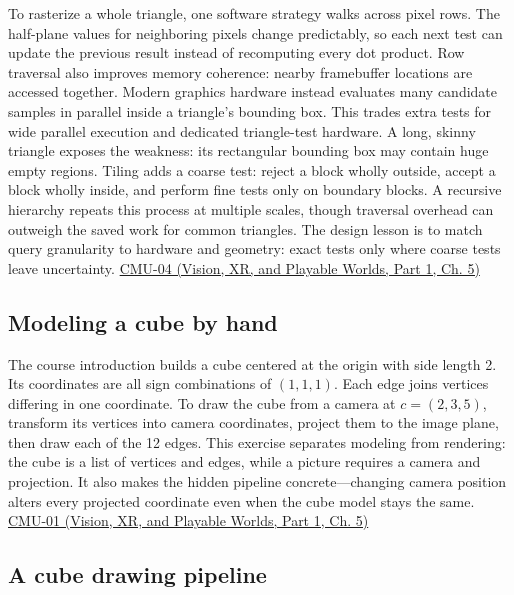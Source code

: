 To rasterize a whole triangle, one software strategy walks across pixel rows. The half-plane values for neighboring pixels change predictably, so each next test can update the previous result instead of recomputing every dot product. Row traversal also improves memory coherence: nearby framebuffer locations are accessed together. Modern graphics hardware instead evaluates many candidate samples in parallel inside a triangle's bounding box. This trades extra tests for wide parallel execution and dedicated triangle-test hardware. A long, skinny triangle exposes the weakness: its rectangular bounding box may contain huge empty regions. Tiling adds a coarse test: reject a block wholly outside, accept a block wholly inside, and perform fine tests only on boundary blocks. A recursive hierarchy repeats this process at multiple scales, though traversal overhead can outweigh the saved work for common triangles. The design lesson is to match query granularity to hardware and geometry: exact tests only where coarse tests leave uncertainty. \href{../07-Vision-XR-and-Playable-Worlds-P01/main.pdf\#nameddest=04-visual-computing-ii-ch036-cmu-04---drawing-a-triangle-and-an-intro-to-sampling}{CMU-04 (Vision, XR, and Playable Worlds, Part 1, Ch. 5)}

\subsection{Modeling a cube by hand}\label{03-visual-computing-i-ch015-modeling-a-cube-by-hand}

\hypertarget{03-visual-computing-i-ch015-modeling-a-cube-by-hand}{}

The course introduction builds a cube centered at the origin with side length 2. Its coordinates are all sign combinations of \((1,1,1)\). Each edge joins vertices differing in one coordinate. To draw the cube from a camera at \(c=(2,3,5)\), transform its vertices into camera coordinates, project them to the image plane, then draw each of the 12 edges. This exercise separates modeling from rendering: the cube is a list of vertices and edges, while a picture requires a camera and projection. It also makes the hidden pipeline concrete---changing camera position alters every projected coordinate even when the cube model stays the same. \href{../07-Vision-XR-and-Playable-Worlds-P01/main.pdf\#nameddest=04-visual-computing-ii-ch036-cmu-01---course-overview}{CMU-01 (Vision, XR, and Playable Worlds, Part 1, Ch. 5)}

\subsection{A cube drawing pipeline}\label{03-visual-computing-i-ch015-a-cube-drawing-pipeline}

